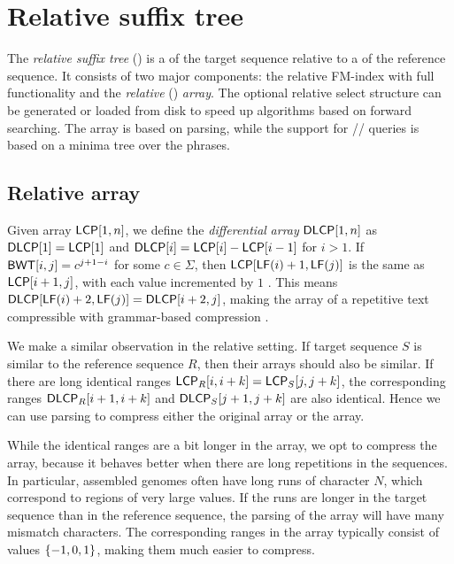 

\section{Relative suffix tree}

The \emph{relative suffix tree} (\RCST) is a \CSTnpr{} of the
target sequence relative to a \CST{} of the reference sequence. It consists of
two major components: the relative FM-index with full functionality and the
\emph{relative} \LCP{} (\RLCP) \emph{array}. The optional relative select
structure can be generated or loaded from disk to speed up algorithms based on
forward searching. The \RLCP{} array is based on \RLZ{} parsing, while the
support for \nsv/\psv/\rmq{} queries is based on a minima tree over the
phrases.

\subsection{Relative \LCP{} array}

Given \LCP{} array $\mathsf{LCP}[1,n]$, we define the \emph{differential} \LCP{}
\emph{array} $\mathsf{DLCP}[1,n]$ as $\mathsf{DLCP}[1] = \mathsf{LCP}[1]$ and $\mathsf{DLCP}[i] = \mathsf{LCP}[i]
- \mathsf{LCP}[i-1]$ for $i > 1$. If $\mathsf{BWT}[i,j] = c^{j+1-i}$ for some $c \in
\Sigma$, then $\mathsf{LCP}[\mathsf{LF}(i)+1,\mathsf{LF}(j)]$ is the same as $\mathsf{LCP}[i+1,j]$, with
each value incremented by $1$ \cite{Fischer2009a}. This means
$\mathsf{DLCP}[\mathsf{LF}(i)+2,\mathsf{LF}(j)] = \mathsf{DLCP}[i+2,j]$, making the \DLCP{} array of a
repetitive text compressible with grammar-based compression
\cite{Abeliuk2013}.

We make a similar observation in the relative setting. If target sequence $S$
is similar to the reference sequence $R$, then their \LCP{} arrays should also
be similar. If there are long identical ranges $\mathsf{LCP}_{R}[i,i+k] =
\mathsf{LCP}_{S}[j,j+k]$, the corresponding \DLCP{} ranges $\mathsf{DLCP}_{R}[i+1,i+k]$ and
$\mathsf{DLCP}_{S}[j+1,j+k]$ are also identical. Hence we can use \RLZ{} parsing to
compress either the original \LCP{} array or the \DLCP{} array.

While the identical ranges are a bit longer in the \LCP{} array, we opt to
compress the \DLCP{} array, because it behaves better when there are long
repetitions in the sequences. In particular, assembled genomes often have long
runs of character $N$, which correspond to regions of very large \LCP{}
values. If the runs are longer in the target sequence than in the reference
sequence, the \RLZ{} parsing of the \LCP{} array will have many
mismatch characters. The corresponding ranges in the
\DLCP{} array typically consist of values $\{ -1, 0, 1 \}$, making them much
easier to compress.

